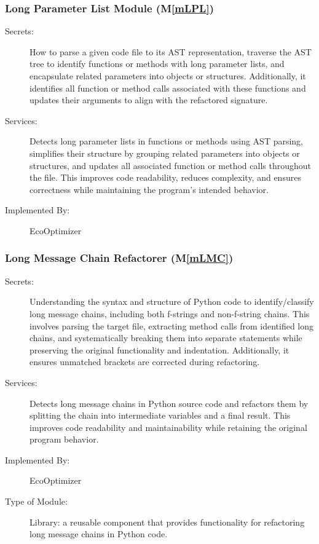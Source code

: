 \documentclass[12pt, titlepage]{article}
\newcommand{\mref}[1]{M\ref{#1}}
\begin{document}
\subsubsection{Long Parameter List Module (\mref{mLPL})}


\begin{description}
    \item[Secrets:] How to parse a given code file to its AST representation, traverse the AST tree to identify functions or methods with long parameter lists, and encapsulate related parameters into objects or structures. Additionally, it identifies all function or method calls associated with these functions and updates their arguments to align with the refactored signature.
    \item[Services:] Detects long parameter lists in functions or methods using AST parsing, simplifies their structure by grouping related parameters into objects or structures, and updates all associated function or method calls throughout the file. This improves code readability, reduces complexity, and ensures correctness while maintaining the program’s intended behavior.
    \item[Implemented By:] EcoOptimizer
\end{description}

\subsubsection{Long Message Chain Refactorer (\mref{mLMC})}


\begin{description}
    \item[Secrets:] Understanding the syntax and structure of Python code to identify/classify long message chains, including both f-strings and non-f-string chains. This involves parsing the target file, extracting method calls from identified long chains, and systematically breaking them into separate statements while preserving the original functionality and indentation. Additionally, it ensures unmatched brackets are corrected during refactoring.
    
    \item[Services:] Detects long message chains in Python source code and refactors them by splitting the chain into intermediate variables and a final result. This improves code readability and maintainability while retaining the original program behavior. 

    \item[Implemented By:] EcoOptimizer
    \item[Type of Module:] Library: a reusable component that provides functionality for refactoring long message chains in Python code.
   
\end{description}
\end{document}
